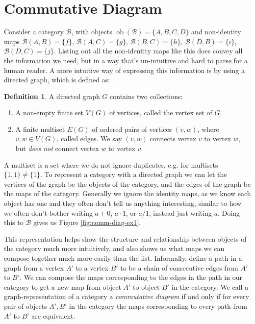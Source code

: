 \documentclass[logo,bsc,singlespacing,parskip]{infthesis}
\theoremstyle{definition}
\newtheorem{defn}[prop]{Definition}
\newcommand{\cat}[1]{\mathscr{#1}}
\newcommand{\ob}[1]{\obj(\mathscr{#1})}
\DeclareMathOperator{\obj}{ob}
\begin{document}
\section{Commutative Diagram}
Consider a category $\cat B$, with objects $\ob{B} = \{A,B,C,D\}$ and non-identity maps $\cat{B}(A,B) = \{f\}$, $\cat{B}(A,C) = \{g\}$, $\cat{B}(B,C) = \{h\}$, $\cat{B}(D,B) = \{i\}$, $\cat{B}(D,C) = \{j\}$. Listing out all the non-identity maps like this does convey all the information we need, but in a way that's un-intuitive and hard to parse for a human reader. A more intuitive way of expressing this information is by using a directed graph, which is defined as:
\begin{defn}
    A directed graph $G$ contains two collections:
    \begin{enumerate}
        \item A non-empty finite set $V(G)$ of vertices, called the vertex set of $G$.
        \item A finite multiset $E(G)$ of ordered pairs of vertices $(v,w)$, where $v, w \in V(G)$, called edges. We say $(v,w)$ connects vertex $v$ to vertex $w$, but \emph{does not} connect vertex $w$ to vertex $v$.
    \end{enumerate}
\end{defn}
A multiset is a set where we do not ignore duplicates, e.g. for multisets $\{1, 1\} \ne \{1\}$. To represent a category with a directed graph we can let the vertices of the graph be the objects of the category, and the edges of the graph be the maps of the category. Generally we ignore the identity maps, as we know each object has one and they often don't tell us anything interesting, similar to how we often don't bother writing $a + 0$, $a \cdot 1$, or $a/1$, instead just writing $a$. Doing this to $\cat B$ gives us Figure \ref{fig:comm-diag-ex1}. 

This representation helps show the structure and relationship between objects of the category much more intuitively, and also shows us what maps we can compose together much more easily than the list. Informally, define a path in a graph from a vertex $A'$ to a vertex $B'$ to be a chain of consecutive edges from $A'$ to $B'$. We can compose the maps corresponding to the edges in the path in our category to get a new map from object $A'$ to object $B'$ in the category. We call a graph-representation of a category a \emph{commutative diagram} if and only if for every pair of objects $A', B'$ in the category the maps corresponding to every path from $A'$ to $B'$ are equivalent.
\end{document}
